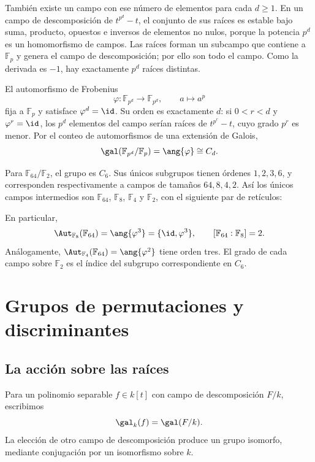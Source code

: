 También existe un campo con ese número de elementos para cada $d\geq1$. En un campo de descomposición de $t^{p^d}-t$, el conjunto de sus raíces es estable bajo suma, producto, opuestos e inversos de elementos no nulos, porque la potencia $p^d$ es un homomorfismo de campos. Las raíces forman un subcampo que contiene a $\mathbb F_p$ y genera el campo de descomposición; por ello son todo el campo. Como la derivada es $-1$, hay exactamente $p^d$ raíces distintas.

El automorfismo de Frobenius
\[
\varphi:\mathbb F_{p^d}\longrightarrow\mathbb F_{p^d},
\qquad a\longmapsto a^p
\]
fija a $\mathbb F_p$ y satisface $\varphi^d=\id$. Su orden es exactamente $d$: si $0<r<d$ y $\varphi^r=\id$, los $p^d$ elementos del campo serían raíces de $t^{p^r}-t$, cuyo grado $p^r$ es menor. Por el conteo de automorfismos de una extensión de Galois,
\[
\gal(\mathbb F_{p^d}/\mathbb F_p)=\ang{\varphi}\cong C_d.
\]

\begin{ejem}\label{ejem:C27-f64}
Para $\mathbb F_{64}/\mathbb F_2$, el grupo es $C_6$. Sus únicos subgrupos tienen órdenes $1,2,3,6$, y corresponden respectivamente a campos de tamaños $64,8,4,2$. Así los únicos campos intermedios son $\mathbb F_{64}$, $\mathbb F_8$, $\mathbb F_4$ y $\mathbb F_2$, con el siguiente par de retículos:

En particular,
\[
\Aut_{\mathbb F_8}(\mathbb F_{64})=\ang{\varphi^3}=\{\id,\varphi^3\},
\qquad [\mathbb F_{64}:\mathbb F_8]=2.
\]
Análogamente, $\Aut_{\mathbb F_4}(\mathbb F_{64})=\ang{\varphi^2}$ tiene orden tres. El grado de cada campo sobre $\mathbb F_2$ es el índice del subgrupo correspondiente en $C_6$.
\end{ejem}

\section{Grupos de permutaciones y discriminantes}
\subsection{La acción sobre las raíces}
Para un polinomio separable $f\in k[t]$ con campo de descomposición $F/k$, escribimos
\[
\gal_k(f)=\gal(F/k).
\]
La elección de otro campo de descomposición produce un grupo isomorfo, mediante conjugación por un isomorfismo sobre $k$.

